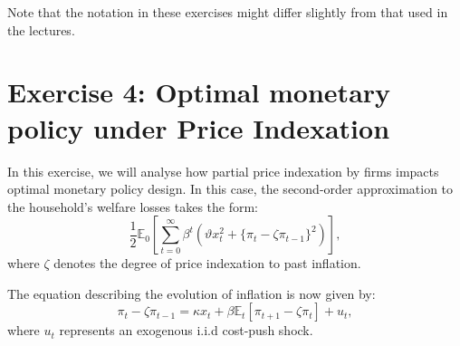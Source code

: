 \documentclass[a4paper,11pt]{article}
\begin{document}
Note that the notation in these exercises might differ slightly from that used in the lectures.




\section*{Exercise 4: Optimal monetary policy under Price Indexation}

In this exercise, we will analyse how partial price indexation by firms impacts optimal monetary policy design. In this case, the second-order approximation to the household's welfare losses takes the form:
\begin{equation*}
    \frac{1}{2} \mathbb{E}_0 \left[ \sum_{t=0}^{\infty} \beta^t (\vartheta x_t^2 + \{ \pi_t  - \zeta \pi_{t-1} \}^2 )\right],
\end{equation*}
where $\zeta$ denotes the degree of price indexation to past inflation.

The equation describing the evolution of inflation is now given by:
\begin{equation*}
    \pi_t - \zeta \pi_{t-1} = \kappa x_t + \beta \mathbb{E}_t [\pi_{t+1} - \zeta \pi_t] + u_t,
\end{equation*}
where $u_t$ represents an exogenous i.i.d cost-push shock.
\end{document}
